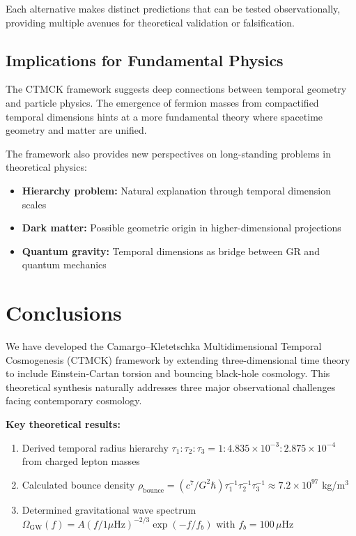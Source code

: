 \documentclass[reprint,amsmath,amssymb,aps,prd,nofootinbib,longbibliography]{revtex4-2}
\begin{document}
Each alternative makes distinct predictions that can be tested observationally, providing multiple avenues for theoretical validation or falsification.

\subsection{Implications for Fundamental Physics}

The CTMCK framework suggests deep connections between temporal geometry and particle physics. The emergence of fermion masses from compactified temporal dimensions hints at a more fundamental theory where spacetime geometry and matter are unified.

The framework also provides new perspectives on long-standing problems in theoretical physics:

\begin{itemize}
\item \textbf{Hierarchy problem:} Natural explanation through temporal dimension scales
\item \textbf{Dark matter:} Possible geometric origin in higher-dimensional projections
\item \textbf{Quantum gravity:} Temporal dimensions as bridge between GR and quantum mechanics
\end{itemize}

\section{Conclusions}

We have developed the Camargo–Kletetschka Multidimensional Temporal Cosmogenesis (CTMCK) framework by extending three-dimensional time theory to include Einstein-Cartan torsion and bouncing black-hole cosmology. This theoretical synthesis naturally addresses three major observational challenges facing contemporary cosmology.

\textbf{Key theoretical results:}
\begin{enumerate}
\item Derived temporal radius hierarchy $\tau_1:\tau_2:\tau_3 = 1:4.835\times10^{-3}:2.875\times10^{-4}$ from charged lepton masses
\item Calculated bounce density $\rho_{\text{bounce}} = (c^7/G^2\hbar)\tau_1^{-1}\tau_2^{-1}\tau_3^{-1} \approx 7.2 \times 10^{97}$ kg/m$^3$
\item Determined gravitational wave spectrum $\Omega_{\text{GW}}(f) = A(f/1\mu\text{Hz})^{-2/3}\exp(-f/f_b)$ with $f_b = 100\,\mu$Hz
\end{enumerate}
\end{document}
